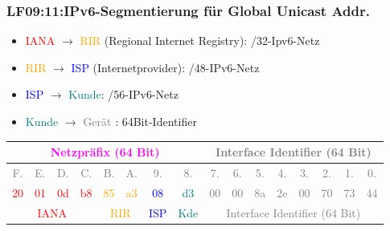 \begin{frame}[fragile]  
  \frametitle{LF09:11:IPv6-Segmentierung für Global Unicast Addr.}
  \vspace{0.2cm}
  \begin{tiny}

  \begin{itemize}
    \item \textcolor{red}{IANA} $\rightarrow$ \textcolor{orange}{RIR} (Regional Internet Registry): /32-Ipv6-Netz
    \item \textcolor{orange}{RIR} $\rightarrow$ \textcolor{blue}{ISP} (Internetprovider): /48-IPv6-Netz
    \item \textcolor{blue}{ISP} $\rightarrow$ \textcolor{teal}{Kunde}: /56-IPv6-Netz
    \item \textcolor{teal}{Kunde} $\rightarrow$ \textcolor{gray}{Gerät} : 64Bit-Identifier
  \end{itemize}


  \begin{center}
    \renewcommand{\arraystretch}{3}
    \begin{tabular}{|c|c|c|c|c|c|c|c|c|c|c|c|c|c|c|c|}
    \hline
     \multicolumn{8}{|c|}{\footnotesize{\textcolor{magenta}{Netzpräfix (64 Bit)}}} &
     \multicolumn{8}{c|}{\footnotesize{\textcolor{gray}{Interface Identifier (64 Bit)}}}\\
    \hline
    \textcolor{gray}{\tiny{F.}} & \textcolor{gray}{\tiny{E.}} &
        \textcolor{gray}{\tiny{D.}} & \textcolor{gray}{\tiny{C.}} &
          \textcolor{gray}{\tiny{B.}} & \textcolor{gray}{\tiny{A.}} &
            \textcolor{gray}{\tiny{9.}} & \textcolor{gray}{\tiny{8.}} &
              \textcolor{gray}{\tiny{7.}} & \textcolor{gray}{\tiny{6.}} &
                \textcolor{gray}{\tiny{5.}} & \textcolor{gray}{\tiny{4.}} &
                  \textcolor{gray}{\tiny{3.}} & \textcolor{gray}{\tiny{2.}} &
                   \textcolor{gray}{\tiny{1.}} & \textcolor{gray}{\tiny{0.}} \\

    \hline
    \textcolor{red}{\tiny{20}} & \textcolor{red}{\tiny{01}} &
        \textcolor{red}{\tiny{0d}} & \textcolor{red}{\tiny{b8}} &
          \textcolor{orange}{\tiny{85}} & \textcolor{orange}{\tiny{a3}} &
            \textcolor{blue}{\tiny{08}} & \textcolor{teal}{\tiny{d3}} &
              \textcolor{gray}{\tiny{00}} & \textcolor{gray}{\tiny{00}} &
                \textcolor{gray}{\tiny{8a}} & \textcolor{gray}{\tiny{2e}} &
                  \textcolor{gray}{\tiny{00}} & \textcolor{gray}{\tiny{70}} &
                   \textcolor{gray}{\tiny{73}} & \textcolor{gray}{\tiny{44}} \\
    \hline
     \multicolumn{4}{|c|}{\footnotesize{\textcolor{red}{IANA}}} &
     \multicolumn{2}{c|}{\footnotesize{\textcolor{orange}{RIR}}} &
     \multicolumn{1}{c|}{\footnotesize{\textcolor{blue}{ISP}}} &
     \multicolumn{1}{c|}{\footnotesize{\textcolor{teal}{Kde}}} &
     \multicolumn{8}{c|}{\footnotesize{\textcolor{gray}{Interface Identifier (64 Bit)}}}\\   
     

\end{tabular}
\end{center}
\end{tiny}
\end{frame}
